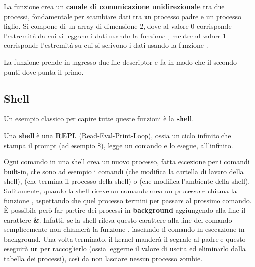 \documentclass[11pt, a4paper, titlepage, oneside]{scrbook}
\begin{document}
\begin{Definizione}
\label{def-pipe}
La funzione  crea un \textbf{canale di comunicazione unidirezionale} tra due processi, fondamentale per scambiare dati tra un processo padre e un processo figlio. Si compone di un array di dimensione 2, dove al valore 0 corrisponde l'estremità da cui si leggono i dati usando la funzione , mentre al valore 1 corrisponde l'estremità su cui si scrivono i dati usando la funzione .
\end{Definizione}

\begin{Definizione}
\label{def-dup2}
La funzione  prende in ingresso due file descriptor e fa in modo che il secondo punti dove punta il primo. 
\end{Definizione}

\subsection{Shell}

Un esempio classico per capire tutte queste funzioni è la \textbf{shell}. 

\begin{Definizione}[Shell]
\label{def-shell}
Una \textbf{shell} è una \textbf{REPL} (Read-Eval-Print-Loop), ossia un ciclo infinito che stampa il prompt (ad esempio \$), legge un comando e lo esegue, all'infinito.
\end{Definizione}

Ogni comando in una shell crea un nuovo processo, fatta eccezione per i comandi built-in, che sono ad esempio i comandi  (che modifica la cartella di lavoro della shell),  (che termina il processo della shell) o  (che modifica l'ambiente della shell). \\ Solitamente, quando la shell riceve un comando crea un processo e chiama la funzione , aspettando che quel processo termini per passare al prossimo comando. È possibile però far partire dei processi in \textbf{background} aggiungendo alla fine il carattere \textbf{\&}. Infatti, se la shell rileva questo carattere alla fine del comando semplicemente non chiamerà la funzione , lasciando il comando in esecuzione in background. Una volta terminato, il kernel manderà il segnale  al padre e questo eseguirà un  per raccoglierlo (ossia leggerne il valore di uscita ed eliminarlo dalla tabella dei processi), così da non lasciare nessun processo zombie.
\end{document}
